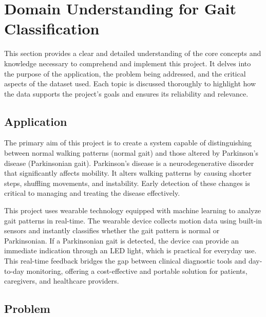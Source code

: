 %
%
%

\chapter{Domain Understanding for Gait Classification}


This section provides a clear and detailed understanding of the core concepts and knowledge necessary to comprehend and implement this project. It delves into the purpose of the application, the problem being addressed, and the critical aspects of the dataset used. Each topic is discussed thoroughly to highlight how the data supports the project's goals and ensures its reliability and relevance.

\section{Application}

The primary aim of this project is to create a system capable of distinguishing between normal walking patterns (normal gait) and those altered by Parkinson’s disease (Parkinsonian gait). Parkinson’s disease is a neurodegenerative disorder that significantly affects mobility. It alters walking patterns by causing shorter steps, shuffling movements, and instability. Early detection of these changes is critical to managing and treating the disease effectively.\cite{WebsterDarter:2019}

This project uses wearable technology equipped with machine learning to analyze gait patterns in real-time. The wearable device collects motion data using built-in sensors and instantly classifies whether the gait pattern is normal or Parkinsonian. If a Parkinsonian gait is detected, the device can provide an immediate indication through an LED light, which is practical for everyday use. This real-time feedback bridges the gap between clinical diagnostic tools and day-to-day monitoring, offering a cost-effective and portable solution for patients, caregivers, and healthcare providers.\cite{ZhangWenwen:2022}

\section{Problem}


